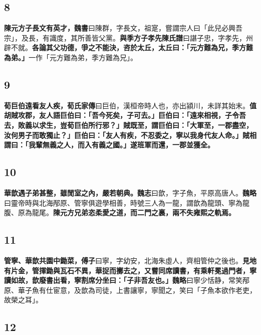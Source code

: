 \subsection*{8}

\textbf{陳元方子長文有英才，}{\footnotesize \textbf{魏書}曰陳群，字長文，祖寔，嘗謂宗人曰「此兒必興吾宗」，及長，有識度，其所善皆父黨。}\textbf{與季方子孝先}{\footnotesize \textbf{陳氏譜}曰諶子忠，字孝先，州辟不就。}\textbf{各論其父功德，爭之不能決，咨於太丘，太丘曰：「元方難為兄，季方難為弟。」}{\footnotesize 一作「元方難為弟，季方難為兄」。}

\subsection*{9}

\textbf{荀巨伯遠看友人疾，}{\footnotesize \textbf{荀氏家傳}曰巨伯，漢桓帝時人也，亦出潁川，未詳其始末。}\textbf{值胡賊攻郡，友人語巨伯曰：「吾今死矣，子可去。」巨伯曰：「遠來相視，子令吾去，敗義以求生，豈荀巨伯所行邪？」賊既至，謂巨伯曰：「大軍至，一郡盡空，汝何男子而敢獨止？」巨伯曰：「友人有疾，不忍委之，寧以我身代友人命。」賊相謂曰：「我輩無義之人，而入有義之國。」遂班軍而還，一郡並獲全。}

\subsection*{10}

\textbf{華歆遇子弟甚整，雖閒室之內，嚴若朝典。}{\footnotesize \textbf{魏志}曰歆，字子魚，平原高唐人。\textbf{魏略}曰靈帝時與北海邴原、管寧俱遊學相善，時號三人為一龍，謂歆為龍頭、寧為龍腹、原為龍尾。}\textbf{陳元方兄弟恣柔愛之道，而二門之裏，兩不失雍熙之軌焉。}

\subsection*{11}

\textbf{管寧、華歆共園中鋤菜，}{\footnotesize \textbf{傅子}曰寧，字幼安，北海朱虛人，齊相管仲之後也。}\textbf{見地有片金，管揮鋤與瓦石不異，華捉而擲去之，又嘗同席讀書，有乘軒冕過門者，寧讀如故，歆廢書出看，寧割席分坐曰：「子非吾友也。」}{\footnotesize \textbf{魏略}曰寧少恬静，常笑邴原、華子魚有仕宦意，及歆為司徒，上書讓寧，寧聞之，笑曰「子魚本欲作老吏，故榮之耳」。}

\subsection*{12}


